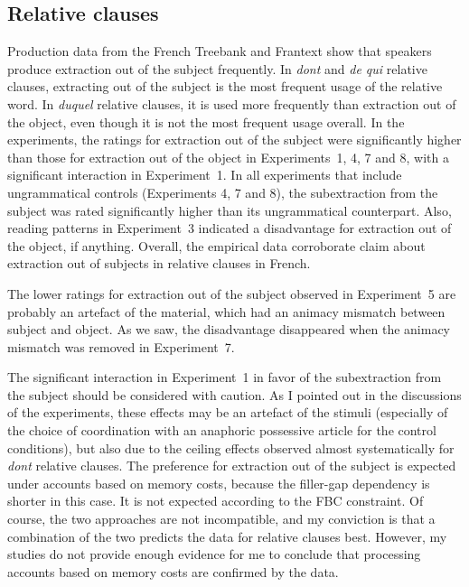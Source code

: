 \subsection{Relative clauses}

Production data from the French Treebank and Frantext show that speakers produce extraction out of the subject frequently. In \textit{dont} and \textit{de qui} relative clauses, extracting out of the subject is the most frequent usage of the relative word. In \textit{duquel} relative clauses, it is used more frequently than extraction out of the object, even though it is not the most frequent usage overall. In the experiments, the ratings for extraction out of the subject were significantly higher than those for extraction out of the object in Experiments~1, 4, 7 and 8, with a significant interaction in Experiment~1. In all experiments that include ungrammatical controls (Experiments 4, 7 and 8), the subextraction from the subject was rated significantly higher than its ungrammatical counterpart. Also, reading patterns in Experiment~3 indicated a disadvantage for extraction out of the object, if anything. Overall, the empirical data corroborate  claim about extraction out of subjects in relative clauses in French. 

The lower ratings for extraction out of the subject observed in Experiment~5 are probably an artefact of the material, which had an animacy mismatch between subject and object. As we saw, the disadvantage disappeared when the animacy mismatch was removed in Experiment~7. 

The significant interaction in Experiment~1 in favor of the subextraction from the subject should be considered with caution. As I pointed out in the discussions of the experiments, these effects may be an artefact of the stimuli (especially of the choice of coordination with an anaphoric possessive article for the control conditions), but also due to the ceiling effects observed almost systematically for \emph{dont} relative clauses. The preference for extraction out of the subject is expected under accounts based on memory costs, because the filler-gap dependency is shorter in this case. It is not expected according to the FBC constraint. Of course, the two approaches are not incompatible, and my conviction is that a combination of the two predicts the data for relative clauses best. However, my studies do not provide enough evidence for me to conclude that processing accounts based on memory costs are confirmed by the data.


